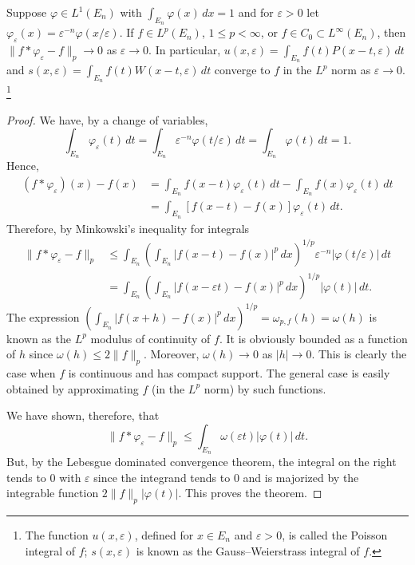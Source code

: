\begin{theorem}\label{thm:c1-1-18}
Suppose $\varphi \in L^{1}(E_{n})$ with
$\int_{E_{n}} \varphi(x) \, dx = 1$ and for $\varepsilon > 0$ let
$\varphi_{\varepsilon}(x) = \varepsilon^{-n} \varphi(x/\varepsilon)$. If
$f \in L^{p}(E_{n})$, $1 \leq p < \infty$, or
$f \in C_{0} \subset L^{\infty}(E_{n})$, then
$\|f * \varphi_{\varepsilon} - f\|_{p} \to 0$ as $\varepsilon \to 0$. In
particular, $u(x, \varepsilon) = \int_{E_{n}} f(t) P(x - t, \varepsilon) \, dt$
and $s(x, \varepsilon) = \int_{E_{n}} f(t) W(x - t, \varepsilon) \, dt$ converge
to $f$ in the $L^{p}$ norm as $\varepsilon \to 0$.%
\footnote{The function $u(x, \varepsilon)$, defined for $x \in E_{n}$ and
$\varepsilon > 0$, is called the Poisson integral of $f$; $s(x, \varepsilon)$ is
known as the Gauss--Weierstrass integral of $f$.}
\end{theorem}

\begin{proof}
We have, by a change of variables,
\[
\int_{E_{n}}\varphi_{\varepsilon}(t)\,dt
=\int_{E_{n}}\varepsilon^{-n}\varphi(t/\varepsilon)\,dt
=\int_{E_{n}}\varphi(t)\,dt=1.
\]
Hence,
\begin{align*}
(f*\varphi_{\varepsilon})(x)-f(x)
&=\int_{E_{n}}f(x-t)\varphi_{\varepsilon}(t)\,dt-\int_{E_{n}}f(x)\varphi_{\varepsilon}(t)\,dt\\
&=\int_{E_{n}}[f(x-t)-f(x)]\varphi_{\varepsilon}(t)\,dt.
\end{align*}
Therefore, by Minkowski's inequality for integrals
\begin{align*}
\|f*\varphi_{\varepsilon}-f\|_{p}
&\leq\int_{E_{n}}\left(\int_{E_{n}}|f(x-t)-f(x)|^{p}\,dx\right)^{1/p}\varepsilon^{-n}|\varphi(t/\varepsilon)|\,dt\\
&=\int_{E_{n}}\left(\int_{E_{n}}|f(x-\varepsilon t)-f(x)|^{p}\,dx\right)^{1/p}|\varphi(t)|\,dt.
\end{align*}
The expression
$(\int_{E_{n}}|f(x+h)-f(x)|^{p}\,dx)^{1/p}=\omega_{p,f}(h)=\omega(h)$ is known
as the $L^{p}$ modulus of continuity of $f$. It is obviously bounded as a
function of $h$ since $\omega(h)\leq2\|f\|_{p}$. Moreover, $\omega(h)\to0$ as
$|h|\to0$. This is clearly the case when $f$ is continuous and has compact
support. The general case is easily obtained by approximating $f$ (in the
$L^{p}$ norm) by such functions.

We have shown, therefore, that
\[
\|f*\varphi_{\varepsilon}-f\|_{p}\leq\int_{E_{n}}\omega(\varepsilon t)|\varphi(t)|\,dt.
\]
But, by the Lebesgue dominated convergence theorem, the integral on the right
tends to $0$ with $\varepsilon$ since the integrand tends to $0$ and is
majorized by the integrable function $2\|f\|_{p}|\varphi(t)|$. This proves the
theorem.
\end{proof}

